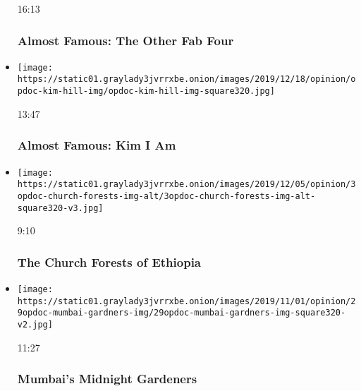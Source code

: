 \begin{itemize}
  16:13

  \hypertarget{almost-famous-the-other-fab-four}{%
  \subsubsection{Almost Famous: The Other Fab
  Four}\label{almost-famous-the-other-fab-four}}
\item
  \href{https://www.nytimes3xbfgragh.onion/video/opinion/100000006865878/almost-famous-kim-i-am.html?action=click\&module=video-series-bar\&region=header\&pgtype=Article\&playlistId=video/op-docs}{}

  \texttt{[image: https://static01.graylady3jvrrxbe.onion/images/2019/12/18/opinion/opdoc-kim-hill-img/opdoc-kim-hill-img-square320.jpg]}

  13:47

  \hypertarget{almost-famous-kim-i-am}{%
  \subsubsection{Almost Famous: Kim I Am}\label{almost-famous-kim-i-am}}
\item
  \href{https://www.nytimes3xbfgragh.onion/video/opinion/100000006808736/the-church-forests-of-ethiopia.html?action=click\&module=video-series-bar\&region=header\&pgtype=Article\&playlistId=video/op-docs}{}

  \texttt{[image: https://static01.graylady3jvrrxbe.onion/images/2019/12/05/opinion/3opdoc-church-forests-img-alt/3opdoc-church-forests-img-alt-square320-v3.jpg]}

  9:10

  \hypertarget{the-church-forests-of-ethiopia}{%
  \subsubsection{The Church Forests of
  Ethiopia}\label{the-church-forests-of-ethiopia}}
\item
  \href{https://www.nytimes3xbfgragh.onion/video/opinion/100000006616228/mumbais-midnight-gardeners.html?action=click\&module=video-series-bar\&region=header\&pgtype=Article\&playlistId=video/op-docs}{}

  \texttt{[image: https://static01.graylady3jvrrxbe.onion/images/2019/11/01/opinion/29opdoc-mumbai-gardners-img/29opdoc-mumbai-gardners-img-square320-v2.jpg]}

  11:27

  \hypertarget{mumbais-midnight-gardeners}{%
  \subsubsection{Mumbai's Midnight
  Gardeners}\label{mumbais-midnight-gardeners}}
\end{itemize}


